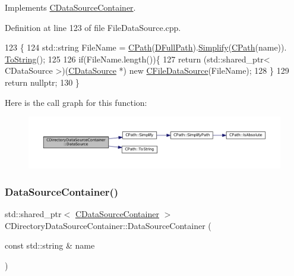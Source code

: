 Implements \hyperlink{classCDataSourceContainer_aea214236c4ed2aef231072b909982f7d}{C\+Data\+Source\+Container}.



Definition at line 123 of file File\+Data\+Source.\+cpp.


\begin{DoxyCode}
123                                                                                            \{
124     std::string FileName = \hyperlink{classCPath}{CPath}(\hyperlink{classCDirectoryDataSourceContainer_ac3d3c7e7d7bc9f68ba8a8747a3dee8b5}{DFullPath}).\hyperlink{classCPath_aa52dcb50c943a8abc8883db5ec43a45e}{Simplify}(\hyperlink{classCPath}{CPath}(name)).
      \hyperlink{classCPath_abbafaf377a7e38e0151bd9567d526951}{ToString}();
125     
126     \textcolor{keywordflow}{if}(FileName.length())\{
127         \textcolor{keywordflow}{return} (std::shared\_ptr< CDataSource >)(\hyperlink{classCDataSource}{CDataSource} *) \textcolor{keyword}{new} 
      \hyperlink{classCFileDataSource}{CFileDataSource}(FileName);
128     \}
129     \textcolor{keywordflow}{return} \textcolor{keyword}{nullptr};
130 \}
\end{DoxyCode}
Here is the call graph for this function\+:
\nopagebreak
\begin{figure}[H]
\begin{center}
\leavevmode
\includegraphics[width=350pt]{classCDirectoryDataSourceContainer_ac925eec9c2c71654d0012bff92a462d4_cgraph}
\end{center}
\end{figure}
\hypertarget{classCDirectoryDataSourceContainer_a71291ab0a549056fc784f0c553a8dc39}{}\label{classCDirectoryDataSourceContainer_a71291ab0a549056fc784f0c553a8dc39} 
\subsubsection{\texorpdfstring{Data\+Source\+Container()}{DataSourceContainer()}}
{\footnotesize\ttfamily std\+::shared\+\_\+ptr$<$ \hyperlink{classCDataSourceContainer}{C\+Data\+Source\+Container} $>$ C\+Directory\+Data\+Source\+Container\+::\+Data\+Source\+Container (\begin{DoxyParamCaption}\item[{const std\+::string \&}]{name }\end{DoxyParamCaption})\hspace{0.3cm}{\ttfamily [virtual]}}



